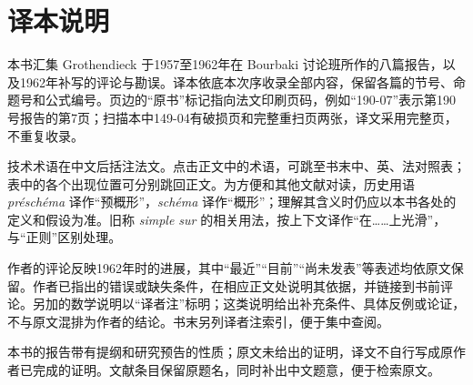 \chapter*{译本说明}
本书汇集 Grothendieck 于1957至1962年在 Bourbaki 讨论班所作的八篇报告，以及1962年补写的评论与勘误。译本依底本次序收录全部内容，保留各篇的节号、命题号和公式编号。页边的“原书”标记指向法文印刷页码，例如“190-07”表示第190号报告的第7页；扫描本中149-04有破损页和完整重扫页两张，译文采用完整页，不重复收录。

技术术语在中文后括注法文。点击正文中的术语，可跳至书末中、英、法对照表；表中的各个出现位置可分别跳回正文。为方便和其他文献对读，历史用语 \textit{préschéma} 译作“预概形”，\textit{schéma} 译作“概形”；理解其含义时仍应以本书各处的定义和假设为准。旧称 \textit{simple sur} 的相关用法，按上下文译作“在……上光滑”，与“正则”区别处理。

作者的评论反映1962年时的进展，其中“最近”“目前”“尚未发表”等表述均依原文保留。作者已指出的错误或缺失条件，在相应正文处说明其依据，并链接到书前评论。另加的数学说明以“译者注”标明；这类说明给出补充条件、具体反例或论证，不与原文混排为作者的结论。书末另列译者注索引，便于集中查阅。

本书的报告带有提纲和研究预告的性质；原文未给出的证明，译文不自行写成原作者已完成的证明。文献条目保留原题名，同时补出中文题意，便于检索原文。
